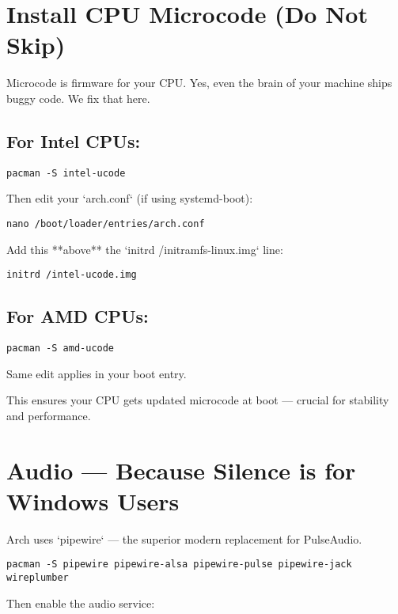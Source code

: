 \documentclass[12pt,openany]{book}
\begin{document}
\section{Install CPU Microcode (Do Not Skip)}

Microcode is firmware for your CPU. Yes, even the brain of your machine ships buggy code. We fix that here.

\subsection*{For Intel CPUs:}

\begin{lstlisting}
pacman -S intel-ucode
\end{lstlisting}

Then edit your `arch.conf` (if using systemd-boot):

\begin{lstlisting}
nano /boot/loader/entries/arch.conf
\end{lstlisting}

Add this **above** the `initrd /initramfs-linux.img` line:

\begin{lstlisting}
initrd /intel-ucode.img
\end{lstlisting}

\subsection*{For AMD CPUs:}

\begin{lstlisting}
pacman -S amd-ucode
\end{lstlisting}

Same edit applies in your boot entry.

This ensures your CPU gets updated microcode at boot — crucial for stability and performance.

\section{Audio — Because Silence is for Windows Users}

Arch uses `pipewire` — the superior modern replacement for PulseAudio.

\begin{lstlisting}
pacman -S pipewire pipewire-alsa pipewire-pulse pipewire-jack wireplumber
\end{lstlisting}

Then enable the audio service:
\end{document}
